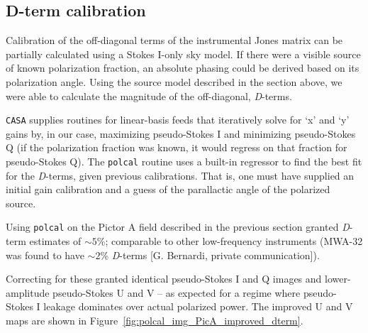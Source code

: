 \subsection{D-term calibration}
\label{subsec:polcal_Dterms}

Calibration of the off-diagonal terms of the instrumental Jones matrix can be partially calculated using a Stokes I-only sky model. If there were a visible source of known polarization fraction, an absolute phasing could be derived based on its polarization angle. Using the source model described in the section above, we were able to calculate the magnitude of the off-diagonal, \textit{D}-terms.

{\tt CASA} supplies routines for linear-basis feeds that iteratively solve for `x' and `y' gains by, in our case, maximizing pseudo-Stokes I and minimizing pseudo-Stokes Q (if the polarization fraction was known, it would regress on that fraction for pseudo-Stokes Q). The {\tt polcal} routine uses a built-in regressor to find the best fit for the \textit{D}-terms, given previous calibrations. That is, one must have supplied an initial gain calibration and a guess of the parallactic angle of the polarized source. 

Using {\tt polcal} on the Pictor A field described in the previous section granted \textit{D}-term estimates of $\sim5\%$; comparable to other low-frequency instruments (MWA-32 was found to have $\sim2$\% \textit{D}-terms [G. Bernardi, private communication]). 

Correcting for these granted identical pseudo-Stokes I and Q images and lower-amplitude pseudo-Stokes U and V -- as expected for a regime where pseudo-Stokes I leakage dominates over actual polarized power. The improved U and V maps are shown in Figure~\ref{fig:polcal_img_PicA_improved_dterm}.

